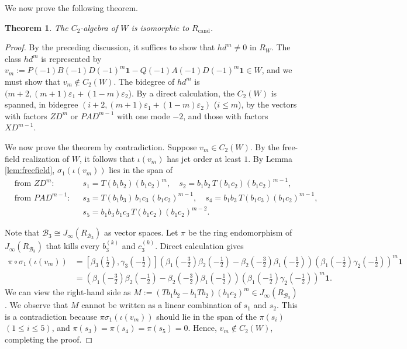 \documentclass[11pt]{amsart}
\newtheorem{theorem}{Theorem}[section]
\theoremstyle{definition}
\theoremstyle{remark}
\newcommand{\B}{\mathcal B}
\begin{document}
We now prove the following theorem.
\begin{theorem}\label{thm:c2ofW}
The $C_2$-algebra of $W$ is isomorphic to $R_{\mathrm{cand}}$. 	
\end{theorem}
\begin{proof}
By the preceding discussion, it suffices to show that $hd^m\neq 0$ in $R_W$. The class $hd^m$ is represented by 
$v_m:=P(-1)B(-1)D(-1)^m\mathbf 1-Q(-1)A(-1)D(-1)^m\mathbf 1\in W$, and we must show that $v_m\notin C_2(W)$. The bidegree of $hd^m$ is $(m+2,(m+1)\varepsilon_1+(1-m)\varepsilon_2$). By a direct calculation, the $C_2(W)$ is spanned, in bidegree $ (i+2,(m+1)\varepsilon_1+(1-m)\varepsilon_2)$ ($i\leq m$), by the vectors with factors $ZD^m$ or $PAD^{m-1}$ with one mode $-2$, and those with factors $XD^{m-1}$.  

We now prove the theorem by contradiction. Suppose $v_m\in C_2(W)$. By the free-field realization of $W$, it follows that $\iota(v_m)$ has jet order at least $1$. By Lemma \ref{lem:freefield}, $\sigma_1(\iota(v_m))$ lies in the span of 
\begin{align*}
&\text{from $ZD^m$:} && s_1=T(b_1b_2)(b_1c_2)^m, \quad s_2=b_1b_2\,T(b_1c_2)(b_1c_2)^{m-1},\\
&\text{from $PAD^{m-1}$:} && s_3=T(b_1b_3)\,b_1c_3\,(b_1c_2)^{m-1}, \quad s_4=b_1b_3\,T(b_1c_3) (b_1c_2)^{m-1},\\
& && s_5=b_1b_3\,b_1c_3\,T(b_1c_2)(b_1c_2)^{m-2}.   
\end{align*}
   	
Note that $\B_3\cong J_\infty(R_{\B_3})$ as vector spaces. Let $\pi$ be the ring endomorphism of $J_\infty(R_{\B_3})$ that kills every $b_3^{(k)}$ and $c_3^{(k)}$. Direct calculation gives
\begin{align*}
\pi\circ \sigma_1(\iota(v_m))&=\left[\beta_3(\frac12),\gamma_3(-\frac12)\right]\left(\beta_1(-\frac32)\beta_2(-\frac12)-\beta_2(-\frac32)\beta_1(-\frac12)\right)\left(\beta_1(-\frac12)\gamma_2(-\frac12)\right)^m\mathbf 1\\
&=\left(\beta_1(-\frac32)\beta_2(-\frac12)-\beta_2(-\frac32)\beta_1(-\frac12)\right)\left(\beta_1(-\frac12)\gamma_2(-\frac12)\right)^m\mathbf 1.
\end{align*}
We can view the right-hand side  as $M:=(Tb_1b_2-b_1Tb_2)(b_1c_2)^m\in J_\infty(R_{\B_3})$. We observe that $M$ cannot be written as a linear combination of $s_1$ and $s_2$. This is a contradiction because $\pi\sigma_1(\iota(v_m))$ should lie in the span of the $\pi(s_i)$ $(1\leq i\leq 5)$, and $\pi(s_3)=\pi(s_4)=\pi(s_5)=0$. Hence, $v_m\notin C_2(W)$, completing the proof.     	
\end{proof}
\end{document}
